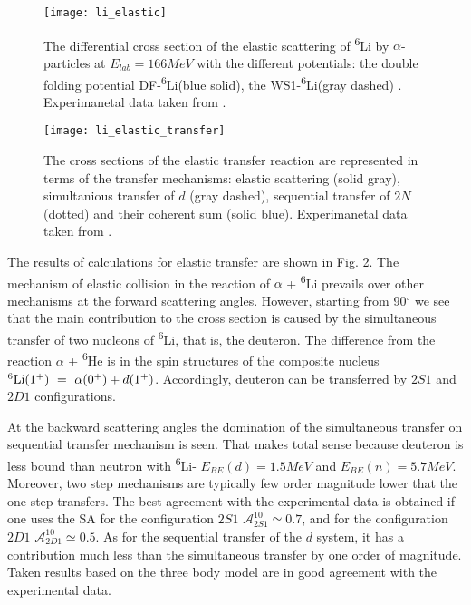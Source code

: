\documentclass[
12pt, %
oneside, %
english, %
doublespacing, %
doublespacing, %
toctotoc, %
parskip, %
headsepline, %
]{MastersDoctoralThesis} %
\newcommand{\he}{\textsuperscript{6}He\xspace}
\newcommand{\li}{\textsuperscript{6}Li\xspace}
\begin{document}
\begin{figure}
\centering
\texttt{[image: li\_elastic]}
\decoRule
\caption{    The differential cross section of the elastic scattering of \li by $\alpha$-particles at $E_{lab} = 166 MeV$ with the different potentials: the double folding potential DF-\li (blue solid), the WS1-\li  (gray dashed) \cite{oganessian1999dynamics}. Experimanetal data taken from \cite{oganessian1999dynamics}.
}
\label{li_elastic}
\end{figure}
\begin{figure}
\centering
\texttt{[image: li\_elastic\_transfer]}
\decoRule
\caption{    The cross sections of the elastic transfer reaction are represented in terms of the transfer mechanisms: elastic scattering (solid gray), simultanious transfer of $d$ (gray dashed), sequential transfer of $2N$ (dotted) and their coherent sum (solid blue). Experimanetal data taken from \cite{oganessian1999dynamics}.
}
\label{li_elastic_transfer}
\end{figure}


The results of calculations for elastic transfer are shown in Fig. \ref{li_elastic_transfer}. 
The mechanism of elastic collision in the reaction of $\alpha$ + \li   prevails over other mechanisms at the forward scattering angles. 
However, starting from 90$^\circ$ we see that the main contribution to the cross section is caused by the simultaneous transfer of two nucleons of  \li, that is, the deuteron. 
The difference from the reaction $ \alpha $ + \he is in the spin structures of the composite nucleus ${\rm \li}(1^+)~=~ \alpha (0^+) + d (1^+) $. Accordingly, deuteron can be transferred by $2S1$ and $2D1$ configurations.

At the backward scattering angles the domination of the simultaneous  transfer on sequential transfer mechanism is seen. That makes total sense because deuteron is less bound than neutron with \li - $E_{BE}(d)=1.5 MeV$ and  $E_{BE}(n)=5.7 MeV$. Moreover, two step mechanisms are typically few order magnitude lower that the one step transfers. 
The best agreement with the experimental data is obtained if one uses the SA for the configuration $2S1$ $ \mathcal {A}^{10} _ {2S1} \simeq 0.7 $, and for the configuration $2D1$ $ \mathcal{A}^ {10}_{2D1} \simeq 0.5 $. 
As for the sequential transfer of the $d$ system, it has a contribution much less than the simultaneous transfer by one order of magnitude. 
Taken results based on the three body model are in good agreement with the experimental data.
\end{document}
